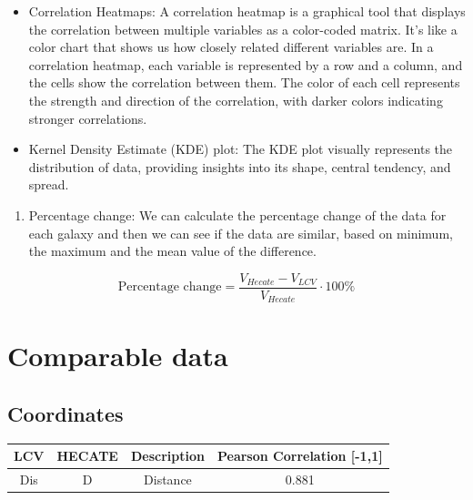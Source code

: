 \documentclass[
]{article}
\providecommand{\tightlist}{%
  \setlength{\itemsep}{0pt}\setlength{\parskip}{0pt}}\usepackage{longtable,booktabs,array}
\begin{document}
\begin{itemize}
\item
  Correlation Heatmaps: A correlation heatmap is a graphical tool that
  displays the correlation between multiple variables as a color-coded
  matrix. It's like a color chart that shows us how closely related
  different variables are. In a correlation heatmap, each variable is
  represented by a row and a column, and the cells show the correlation
  between them. The color of each cell represents the strength and
  direction of the correlation, with darker colors indicating stronger
  correlations.
\item
  Kernel Density Estimate (KDE) plot: The KDE plot visually represents
  the distribution of data, providing insights into its shape, central
  tendency, and spread.
\end{itemize}

\begin{enumerate}
\def\labelenumi{\arabic{enumi}.}
\setcounter{enumi}{4}
\tightlist
\item
  Percentage change: We can calculate the percentage change of the data
  for each galaxy and then we can see if the data are similar, based on
  minimum, the maximum and the mean value of the difference.
\end{enumerate}

\[\text{Percentage change} = \frac{V_{Hecate} - V_{LCV}}{V_{Hecate}}\cdot 100 \%\]

\section{Comparable data}\label{comparable-data}

\subsection{Coordinates}\label{coordinates}

\begin{longtable}[]{@{}cccc@{}}
\toprule\noalign{}
LCV & HECATE & Description & Pearson Correlation {[}-1,1{]} \\
\midrule\noalign{}
\endhead
\bottomrule\noalign{}
\endlastfoot
Dis & D & Distance & 0.881 \\
\end{longtable}
\end{document}
